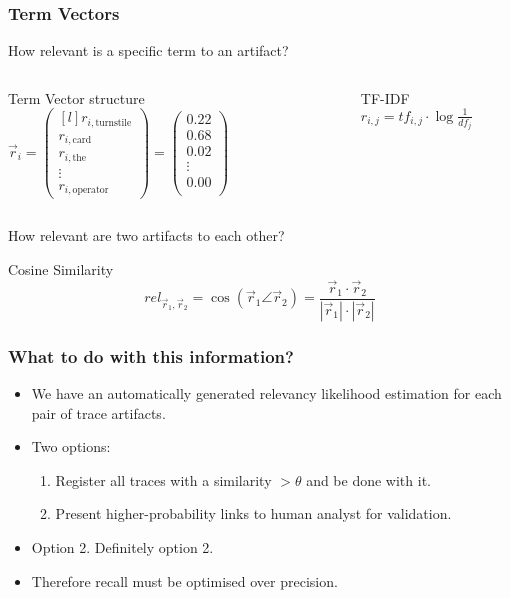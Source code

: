 \documentclass{beamer}
\begin{document}
\begin{frame}
\frametitle{Term Vectors}
How relevant is a specific term to an artifact?

\begin{columns}
\begin{block}{Term Vector structure}
\(
\vec{r}_i=
\begin{pmatrix*}[l]
  r_{i,\text{turnstile}}\\
  r_{i,\text{card}}\\
  r_{i,\text{the}}\\
  \vdots\\
  r_{i,\text{operator}}
\end{pmatrix*}
=
\begin{pmatrix}
  0.22\\
  0.68\\
  0.02\\
  \vdots\\
  0.00\\
\end{pmatrix}
\)
\end{block}

\pause

\begin{block}{TF-IDF}
\(
r_{i,j} = tf_{i,j}\cdot\log\frac{1}{df_j}
\)
\end{block}

\pause

\end{columns}

\vfill
How relevant are two artifacts to each other?

\begin{block}{Cosine Similarity}
  \[ rel_{\vec r_1, \vec r_2} = \cos(\vec r_1 \angle \vec r_2)
  = \frac{\vec r_1 \cdot \vec r_2}{|\vec r_1| \cdot |\vec r_2| } \]
\end{block}

\end{frame}

\begin{frame}
\frametitle{What to do with this information?}
\begin{itemize}
\item We have an automatically generated relevancy likelihood estimation for each pair of trace artifacts.
\item Two options:
  \begin{enumerate}
  \item Register all traces with a similarity $>\theta$ and be done with it.
  \item Present higher-probability links to human analyst for validation.
  \end{enumerate}
\item Option 2. Definitely option 2.
\item Therefore recall must be optimised over precision.
\end{itemize}
\end{frame}
\end{document}
